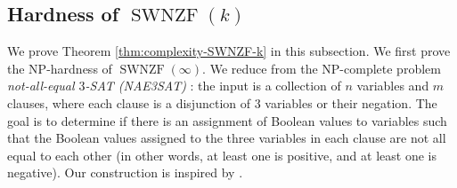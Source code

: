 \documentclass[11pt]{article}
\begin{document}
\subsection{Hardness of $\operatorname{SWNZF}(k)$}\label{sec:SWNZF-hardness}
We prove Theorem \ref{thm:complexity-SWNZF-k} in this subsection. We first prove the NP-hardness of $\operatorname{SWNZF}(\infty)$. We reduce from the NP-complete problem \emph{not-all-equal $3$-SAT (NAE3SAT)} \cite{schaefer1978complexity}: the input is a collection of $n$ variables and $m$ clauses, where each clause is a disjunction of $3$ variables or their negation. The goal is to determine if there is an assignment of Boolean values to variables such that the Boolean values assigned to the three variables in each clause are not all equal to each other (in other words, at least one is positive, and at least one is negative). Our construction is inspired by \cite{martinez2006complexity}.
\end{document}
